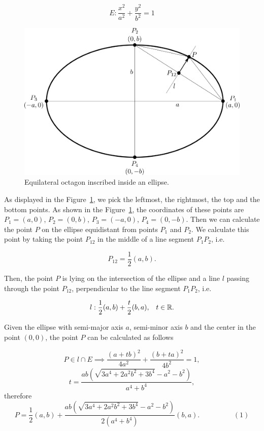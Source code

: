 $$E: \frac{x^2}{a^2} + \frac{y^2}{b^2} = 1$$
\begin{figure}
    \centerline{\includegraphics[scale=0.5]{images/img13}}
    \caption[Equilateral octagon inscribed inside an ellipse]
    {Equilateral octagon inscribed inside an ellipse.}
    \label{img:13}
\end{figure}
As displayed in the Figure~\ref{img:13}, we pick the leftmost, the rightmost, the top
and the bottom points. As shown in the Figure~\ref{img:13}, the coordinates of these 
points are $P_1 = (a, 0)$, $P_2 = (0, b)$, $P_3=(-a, 0)$, $P_4 = (0, -b)$.
Then we can calculate the point $P$ on the ellipse equidistant
from points $P_1$ and $P_2$. We calculate this point by taking the point $P_{12}$ 
in the middle of a line segment $P_1P_2$, i.e.

$$P_{12} = \frac{1}{2}(a, b).$$

Then, the point $P$ is lying on the
intersection of the ellipse and a line $l$ passing through the point $P_{12}$, perpendicular to the
line segment $P_1P_2$, i.e.

$$l: \frac{1}{2}(a,b) + \frac{t}{2}(b,a), \hspace{3mm} t \in \mathbb{R}.$$

Given the ellipse with semi-major axis $a$, 
semi-minor axis $b$ and the center in the point $(0, 0)$, the point $P$ can be 
calculated as follows

$$P \in l \cap E \implies 
\frac{(a+tb)^2}{4a^2} + \frac{(b+ta)^2}{4b^2} = 1,$$
$$t=\frac{ab(\sqrt{3a^4+2a^2b^2+3b^4}-a^2-b^2)}{a^4+b^4},$$
therefore 
$$P=\frac{1}{2}(a,b) + \frac{ab(\sqrt{3a^4+2a^2b^2+3b^4}-a^2-b^2)}{2(a^4+b^4)}(b,a). \hspace{2cm} (1)$$

